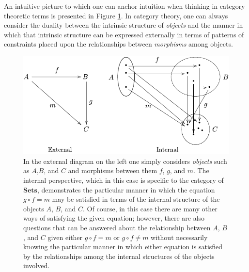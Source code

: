 An intuitive picture to which one can anchor intuition when thinking in category theoretic terms is presented in Figure \ref{fig:intextdiag}. In category theory, one can always consider the duality between the intrinsic structure of \emph{objects} and the manner in which that intrinsic structure can be expressed externally in terms of patterns of constraints placed upon the relationships between \emph{morphisms} among objects.

\begin{figure}
\begin{center}
\noindent\includegraphics[width=0.8\columnwidth]{fig/intextdiag.pdf}
\end{center}
\caption{In the external diagram on the left one simply considers \emph{objects} such as $A$,$B$, and $C$ and morphisms between them $f$, $g$, and $m$. The internal perspective, which in this case is specific to the category of $\mathbf{Sets}$, demonstrates the particular manner in which the equation $g \circ f = m$ may be satisfied in terms of the internal structure of the objects $A$, $B$, and $C$. Of course, in this case there are many other ways of satisfying the given equation; however, there are also questions that can be answered about the relationship between $A$, $B$, and $C$ given either $g \circ f = m$ or $g \circ f \neq m$ without necessarily knowing the particular manner in which either equation is satisfied by the relationships among the internal structures of the objects involved.}
\label{fig:intextdiag}
\end{figure}
